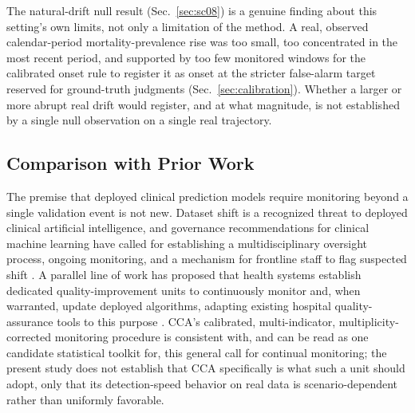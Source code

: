 \documentclass[apajournal,article,submit,oneauthor]{Definitions/mdpi}
\begin{document}
The natural-drift null result (Sec.~\ref{sec:sc08}) is a genuine finding about this setting's own limits, not only a limitation of the method. A real, observed calendar-period mortality-prevalence rise was too small, too concentrated in the most recent period, and supported by too few monitored windows for the calibrated onset rule to register it as onset at the stricter false-alarm target reserved for ground-truth judgments (Sec.~\ref{sec:calibration}). Whether a larger or more abrupt real drift would register, and at what magnitude, is not established by a single null observation on a single real trajectory.

\subsection{Comparison with Prior Work}\label{sec:disc-priorwork}

The premise that deployed clinical prediction models require monitoring beyond a single validation event is not new. Dataset shift is a recognized threat to deployed clinical artificial intelligence, and governance recommendations for clinical machine learning have called for establishing a multidisciplinary oversight process, ongoing monitoring, and a mechanism for frontline staff to flag suspected shift \citep{finlayson2021}. A parallel line of work has proposed that health systems establish dedicated quality-improvement units to continuously monitor and, when warranted, update deployed algorithms, adapting existing hospital quality-assurance tools to this purpose \citep{feng2022}. CCA's calibrated, multi-indicator, multiplicity-corrected monitoring procedure is consistent with, and can be read as one candidate statistical toolkit for, this general call for continual monitoring; the present study does not establish that CCA specifically is what such a unit should adopt, only that its detection-speed behavior on real data is scenario-dependent rather than uniformly favorable.
\end{document}
